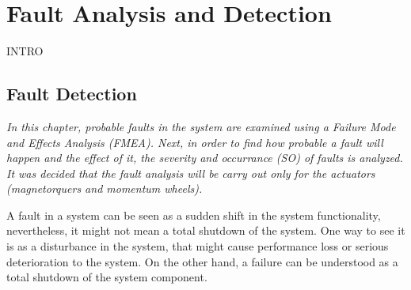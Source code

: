 \chapter{Fault  Analysis and Detection}

INTRO 

\section{Fault Detection}
\textit{In this chapter, probable faults in the system are examined using a  Failure Mode and Effects Analysis (FMEA). Next, in order to find how probable a fault will happen and the effect of it, the severity and occurrance (SO)   of faults is analyzed. It was decided that the fault analysis will be carry out only for the actuators (magnetorquers and momentum wheels).}

A fault in a system can be seen as a sudden shift in the system functionality, nevertheless, it might not mean a total shutdown of the system. One way to see it is as a disturbance in the system, that might cause performance loss or serious deterioration to the system. On the other hand, a failure can be understood as a total shutdown of the system component. 

